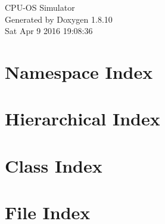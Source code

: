 \documentclass[twoside]{book}
\newcommand{\+}{\discretionary{\mbox{\scriptsize$\hookleftarrow$}}{}{}}
\newcommand{\clearemptydoublepage}{%
  \newpage{\pagestyle{empty}\cleardoublepage}%
}
\begin{document}
\hypersetup{pageanchor=false,
             bookmarks=true,
             bookmarksnumbered=true,
             pdfencoding=unicode
            }
\begin{titlepage}
\vspace*{7cm}
\begin{center}%
{\Large C\+P\+U-\/\+O\+S Simulator }\\
\vspace*{1cm}
{\large Generated by Doxygen 1.8.10}\\
\vspace*{0.5cm}
{\small Sat Apr 9 2016 19:08:36}\\
\end{center}
\end{titlepage}
\clearemptydoublepage
\tableofcontents
\clearemptydoublepage
{}
\hypersetup{pageanchor=true}

\chapter{Namespace Index}

\chapter{Hierarchical Index}

\chapter{Class Index}

\chapter{File Index}

\end{document}
